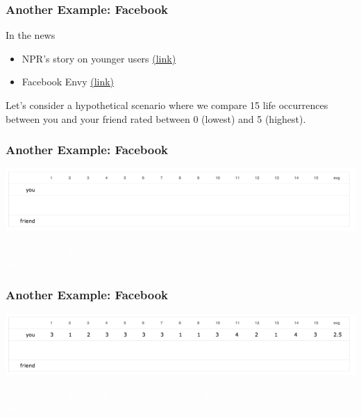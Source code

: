 \documentclass[slides]{beamer}
\newcommand{\blue}[1]{\textcolor{blue2}{#1}}
\begin{document}
\begin{frame}
\frametitle{Another Example: Facebook}

In the news
\begin{itemize}
\item NPR's story on younger users \blue{\href{http://www.npr.org/2014/01/09/261108836/many-younger-facebook-users-unfriend-the-network}{(link)}}
\item Facebook Envy \blue{\href{http://psychcentral.com/blog/archives/2015/04/09/the-psychology-of-facebook-depression-avoid-social-comparisons-envy/}{(link)}}
\end{itemize}

\pause \vspace{1cm}

Let's consider a hypothetical scenario where we compare 15 life occurrences between you and your friend rated between 0 (lowest) and 5 (highest).

\end{frame}


\begin{frame}
\frametitle{Another Example: Facebook}

\begin{center}
\includegraphics[width=\textwidth]{./figure/FB1}
\end{center}

\textcolor{white}{The selective ``Facebook image curation'' your friend performed is a form of selection bias!}

\end{frame}


\begin{frame}
\frametitle{Another Example: Facebook}

\begin{center}
\includegraphics[width=\textwidth]{./figure/FB2}
\end{center}

\textcolor{white}{The selective ``Facebook image curation'' your friend performed is a form of selection bias!}

\end{frame}
\end{document}
